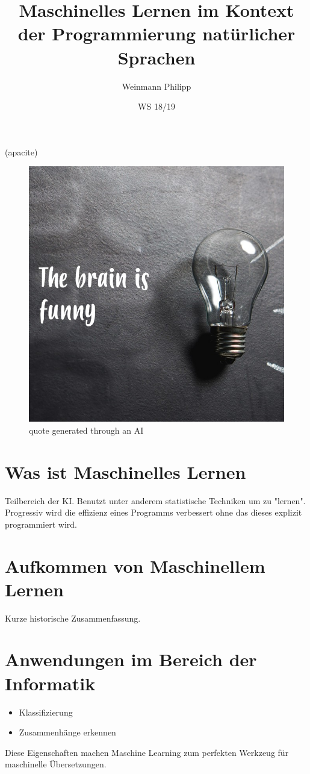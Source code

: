 \documentclass{article}
\title{Maschinelles Lernen im Kontext der Programmierung natürlicher Sprachen}
\date{WS 18/19}
\author{Weinmann Philipp}
\begin{document}
\maketitle

(apacite)


\newpage{}

\begin{figure}[h]
  \includegraphics[width=\linewidth]{images/inspirobotQuote.jpg}
  \caption{quote generated through an AI}
  \label{fig:Inspirational quote by AI \cite{inspirobot}}
\end{figure}
\section{Was ist Maschinelles Lernen}
Teilbereich der KI. Benutzt unter anderem statistische Techniken um zu "lernen". Progressiv wird die effizienz eines Programms verbessert ohne das dieses explizit programmiert wird.
\section{Aufkommen von Maschinellem Lernen}
Kurze historische Zusammenfassung.
\section{Anwendungen im Bereich der Informatik	}
\begin{itemize}
	\item Klassifizierung
	\item Zusammenhänge erkennen
\end{itemize}
Diese Eigenschaften machen Maschine Learning zum perfekten Werkzeug für maschinelle Übersetzungen.
\end{document}
